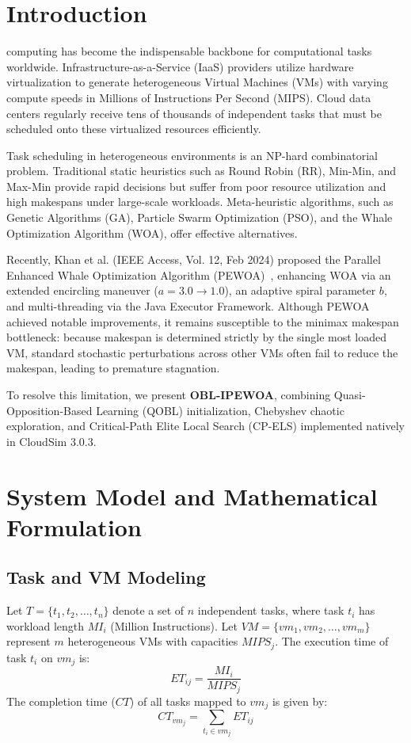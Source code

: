\documentclass[journal]{IEEEtran}
\begin{document}
\section{Introduction}
 computing has become the indispensable backbone for computational tasks worldwide. Infrastructure-as-a-Service (IaaS) providers utilize hardware virtualization to generate heterogeneous Virtual Machines (VMs) with varying compute speeds in Millions of Instructions Per Second (MIPS). Cloud data centers regularly receive tens of thousands of independent tasks that must be scheduled onto these virtualized resources efficiently.

Task scheduling in heterogeneous environments is an NP-hard combinatorial problem. Traditional static heuristics such as Round Robin (RR), Min-Min, and Max-Min provide rapid decisions but suffer from poor resource utilization and high makespans under large-scale workloads. Meta-heuristic algorithms, such as Genetic Algorithms (GA), Particle Swarm Optimization (PSO), and the Whale Optimization Algorithm (WOA), offer effective alternatives.

Recently, Khan et al. (IEEE Access, Vol. 12, Feb 2024) proposed the Parallel Enhanced Whale Optimization Algorithm (PEWOA)~\cite{khan2024parallel}, enhancing WOA via an extended encircling maneuver ($a = 3.0 \to 1.0$), an adaptive spiral parameter $b$, and multi-threading via the Java Executor Framework. Although PEWOA achieved notable improvements, it remains susceptible to the minimax makespan bottleneck: because makespan is determined strictly by the single most loaded VM, standard stochastic perturbations across other VMs often fail to reduce the makespan, leading to premature stagnation.

To resolve this limitation, we present \textbf{OBL-IPEWOA}, combining Quasi-Opposition-Based Learning (QOBL) initialization, Chebyshev chaotic exploration, and Critical-Path Elite Local Search (CP-ELS) implemented natively in CloudSim 3.0.3.

\section{System Model and Mathematical Formulation}
\subsection{Task and VM Modeling}
Let $T = \{t_1, t_2, \dots, t_n\}$ denote a set of $n$ independent tasks, where task $t_i$ has workload length $MI_i$ (Million Instructions). Let $VM = \{vm_1, vm_2, \dots, vm_m\}$ represent $m$ heterogeneous VMs with capacities $MIPS_j$.
The execution time of task $t_i$ on $vm_j$ is:
\begin{equation}
ET_{ij} = \frac{MI_i}{MIPS_j}
\end{equation}
The completion time ($CT$) of all tasks mapped to $vm_j$ is given by:
\begin{equation}
CT_{vm_j} = \sum_{t_i \in vm_j} ET_{ij}
\end{equation}
\end{document}
